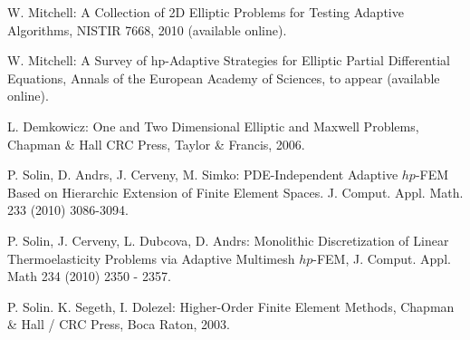 \begin{thebibliography}{[KLR73]}

%

W. Mitchell: A Collection of 2D Elliptic Problems for
Testing Adaptive Algorithms, NISTIR 7668, 2010 (available online).

W. Mitchell: A Survey of hp-Adaptive Strategies for Elliptic Partial Differential Equations,
Annals of the European Academy of Sciences, to appear (available online).

L. Demkowicz: One and Two Dimensional Elliptic and Maxwell Problems,
Chapman \& Hall \/ CRC Press, Taylor \& Francis, 2006.


P. Solin, D. Andrs, J. Cerveny, M. Simko:
PDE-Independent Adaptive $hp$-FEM Based on Hierarchic Extension of Finite Element Spaces.
J. Comput. Appl. Math. 233 (2010) 3086-3094.

P. Solin, J. Cerveny, L. Dubcova, D. Andrs:
Monolithic Discretization of Linear Thermoelasticity Problems
via Adaptive Multimesh $hp$-FEM, J. Comput. Appl. Math 234 (2010) 2350 - 2357.

P. Solin. K. Segeth, I. Dolezel: Higher-Order Finite Element Methods, Chapman \& Hall
/ CRC Press, Boca Raton, 2003.
\end{thebibliography}

%
%
%
%
%
%
%
%
%
%
%
